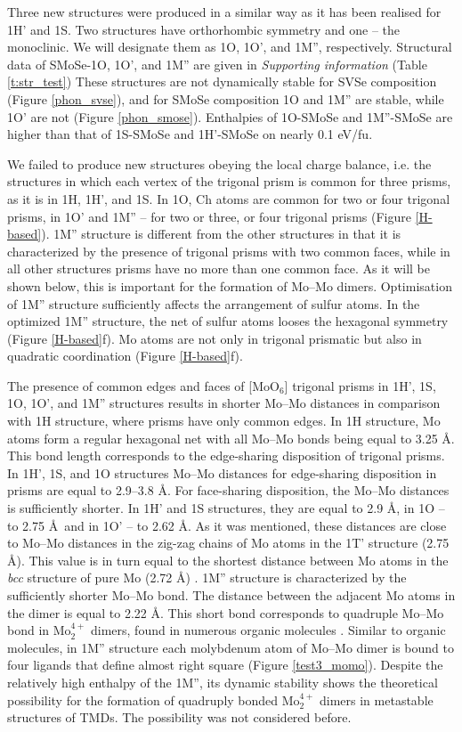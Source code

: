 \documentclass[a4paperm]{article}
\begin{document}
Three new structures were produced in a similar way as it has been realised for 1H' and 1S.
Two structures have orthorhombic symmetry and one – the monoclinic.
We will designate them as 1O, 1O', and 1M'', respectively.
Structural data of SMoSe-1O, 1O', and 1M'' are given in {\it Supporting information} (Table \ref{t:str_test})
These structures are not dynamically stable for SVSe composition (Figure \ref{phon_svse}), and for SMoSe composition 1O and 1M'' are stable, while 1O' are not (Figure \ref{phon_smose}).
Enthalpies of 1O-SMoSe and 1M''-SMoSe are higher than that of  1S-SMoSe and 1H'-SMoSe on nearly 0.1 eV/fu.

We failed to produce new structures obeying the local charge balance, i.e. the structures in which each vertex of the trigonal prism is common for three prisms, as it is in 1H, 1H', and 1S.
In 1O, Ch atoms are common for two or four trigonal prisms, in 1O' and 1M'' – for two or three, or four trigonal prisms (Figure \ref{H-based}).
1M'' structure is different from the other structures in that it is characterized by the presence of trigonal prisms with two common faces, while in all other structures prisms have no more than one common face.
As it will be shown below, this is important for the formation of Mo--Mo dimers.
Optimisation of 1M'' structure sufficiently affects the arrangement of sulfur atoms.
In the optimized 1M'' structure, the net of sulfur atoms looses the hexagonal symmetry (Figure \ref{H-based}f).
Mo atoms are not only in trigonal prismatic but also in quadratic coordination (Figure \ref{H-based}f).


The presence of common edges and faces of [MoO$_6$] trigonal prisms in 1H', 1S, 1O, 1O', and 1M'' structures results in shorter Mo--Mo distances in comparison with 1H structure, where prisms have only common edges.
In 1H structure, Mo atoms form a regular hexagonal net with all Mo--Mo bonds being equal to 3.25 \AA.
This bond length corresponds to the edge-sharing disposition of trigonal prisms.
In 1H', 1S, and 1O structures Mo--Mo distances for edge-sharing disposition in prisms are equal to 2.9--3.8 \AA.
For face-sharing disposition, the Mo--Mo distances is sufficiently shorter.
In 1H' and 1S structures, they are equal to 2.9 \AA, in 1O -- to 2.75 \AA\ and in 1O' -- to 2.62 \AA.
As it was mentioned, these distances are close to Mo--Mo distances in the zig-zag chains of Mo atoms in the 1T' structure (2.75 \AA).
This value is in turn equal to the shortest distance between Mo atoms in the {\it bcc} structure of pure Mo (2.72 \AA) \cite{MoV}.
1M'' structure is characterized by the sufficiently shorter Mo--Mo bond.
The distance between the adjacent Mo atoms in the dimer is equal to 2.22 \AA.
This short bond corresponds to quadruple Mo--Mo bond in Mo$_2^{4+}$ dimers, found in numerous organic molecules \cite{momo}.
Similar to organic molecules, in 1M'' structure  each molybdenum atom of Mo--Mo dimer is bound to four ligands that define almost right square (Figure \ref{test3_momo}).
Despite the relatively high enthalpy of the 1M'', its dynamic stability shows the theoretical possibility for the formation of quadruply bonded Mo$_2^{4+}$ dimers in metastable structures of TMDs.
The possibility was not considered before.
\end{document}
